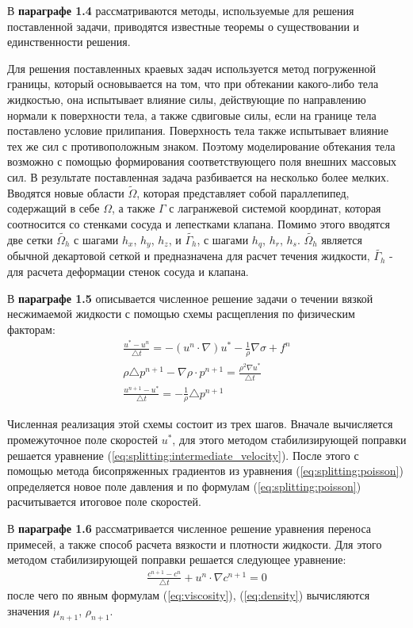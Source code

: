 В \textbf{параграфе 1.4} рассматриваются методы, используемые для решения поставленной задачи, приводятся известные теоремы
о существовании и единственности решения.

Для решения поставленных краевых задач используется метод погруженной границы, который основывается на том, что при 
обтекании какого-либо тела жидкостью, она испытывает влияние силы, действующие по направлению нормали к поверхности тела, а также 
сдвиговые силы, если на границе тела поставлено условие прилипания. Поверхность тела также испытывает влияние тех же сил с 
противоположным знаком. Поэтому моделирование обтекания тела возможно с помощью формирования соответствующего поля внешних 
массовых сил.
В результате поставленная задача разбивается на несколько более мелких. Вводятся новые области $\tilde{\Omega}$, которая представляет собой
параллепипед, содержащий в себе $\Omega$, а также $\Gamma$ с лагранжевой системой координат, которая соотносится со стенками сосуда и лепестками
клапана.
Помимо этого вводятся две сетки $\tilde{\Omega_h}$ с шагами $h_x$, $h_y$, $h_z$, и $\tilde{\Gamma_h}$, с шагами
$h_q$, $h_r$, $h_s$. $\tilde{\Omega_h}$ является обычной декартовой сеткой и предназначена для расчет течения жидкости,
$\tilde{\Gamma_h}$ - для расчета деформации стенок сосуда и клапана.

В \textbf{параграфе 1.5} описывается численное решение задачи о течении вязкой несжимаемой жидкости с помощью
схемы расщепления по физическим факторам:
\begin{gather}
    \label{eq:splitting:intermediate_velocity}
    \frac{u^* - u^n}{\triangle t} = - (u^n \cdot \nabla) u^* - \frac{1}{\rho} \nabla \sigma + f^n\\
    \label{eq:splitting:poisson}
    \rho \triangle p^{n+1} - \nabla \rho \cdot p^{n+1} = \frac{\rho^2 \nabla u^*}{\triangle t}\\
    \label{eq:splitting:velocity}
    \frac{u^{n+1} - u^*}{\triangle t} = - \frac{1}{\rho} \triangle p^{n+1}
\end{gather}

Численная реализация этой схемы состоит из трех шагов. Вначале вычисляется промежуточное поле скоростей $u^{*}$,
для этого методом стабилизирующей поправки решается уравнение (\ref{eq:splitting:intermediate_velocity}).
После этого с помощью метода бисопряженных градиентов из уравнения (\ref{eq:splitting:poisson}) определяется новое поле давления и 
по формулам (\ref{eq:splitting:poisson}) расчитывается итоговое поле скоростей.

В \textbf{параграфе 1.6} рассматривается численное решение уравнения переноса примесей, а также способ расчета вязкости и плотности жидкости.
Для этого методом стабилизирующей поправки решается следующее уравнение:
\begin{gather}
    \label{eq:numerical_concentration}
    \frac{c^{n+1} - c^{n}}{\triangle t} + u^{n} \cdot \nabla c^{n+1} = 0
\end{gather}
после чего по явным формулам (\ref{eq:viscosity}), (\ref{eq:density}) вычисляются значения $\mu_{n+1}$, $\rho_{n+1}$.

